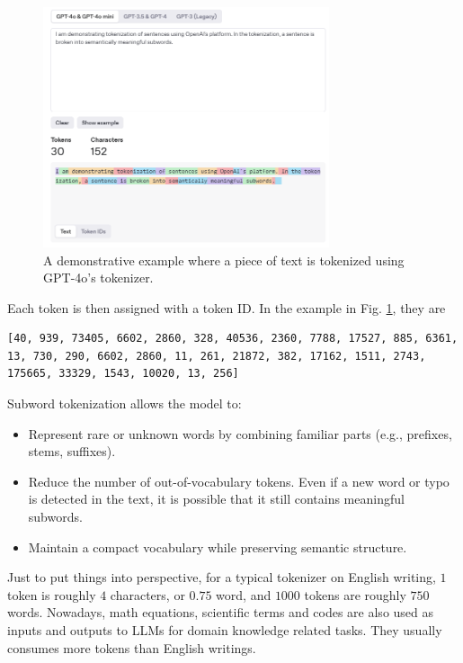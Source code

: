 \begin{figure}[!htb]
	\centering
	\includegraphics[width=0.75\textwidth]{./chapters/part-7/figures/tokenizer.png}
	\caption{A demonstrative example where a piece of text is tokenized using GPT-4o's tokenizer.}
	\label{fig:tokenizer}
\end{figure}

Each token is then assigned with a token ID. In the example in Fig. \ref{fig:tokenizer}, they are
\begin{lstlisting}
[40, 939, 73405, 6602, 2860, 328, 40536, 2360, 7788, 17527, 885, 6361, 13, 730, 290, 6602, 2860, 11, 261, 21872, 382, 17162, 1511, 2743, 175665, 33329, 1543, 10020, 13, 256]
\end{lstlisting}

Subword tokenization allows the model to:
\begin{itemize}
	\item Represent rare or unknown words by combining familiar parts (e.g., prefixes, stems, suffixes).
	\item Reduce the number of out-of-vocabulary tokens. Even if a new word or typo is detected in the text, it is possible that it still contains meaningful subwords.
	\item Maintain a compact vocabulary while preserving semantic structure.
\end{itemize}

Just to put things into perspective, for a typical tokenizer on English writing, $1$ token is roughly $4$ characters, or $0.75$ word, and $1000$ tokens are roughly $750$ words. Nowadays, math equations, scientific terms and codes are also used as inputs and outputs to LLMs for domain knowledge related tasks. They usually consumes more tokens than English writings.

